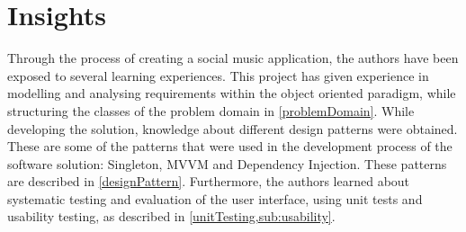 \chapter{Insights}
\label{cha:perspectivation}

Through the process of creating a social music application, the authors have been exposed to several learning experiences. This project has given experience in modelling and analysing requirements within the object oriented paradigm, while structuring the classes of the problem domain in \cref{problemDomain}.
While developing the solution, knowledge about different design patterns were obtained. These are some of the patterns that were used in the development process of the software solution: Singleton, MVVM and Dependency Injection. These patterns are described in \cref{designPattern}. 
Furthermore, the authors learned about systematic testing and evaluation of the user interface, using unit tests and usability testing, as described in \cref{unitTesting,sub:usability}. 
